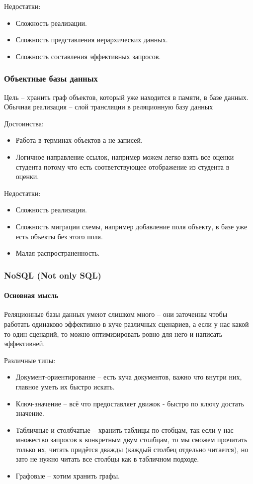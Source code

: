 Недостатки:
\begin{itemize}
	\item Сложность реализации.
	\item Сложность представления иерархических данных.
	\item Сложность составления эффективных запросов.
\end{itemize}

\subsubsection{Объектные базы данных}
Цель -- хранить граф объектов, который уже находится в памяти, в базе данных. Обычная реализация --
слой трансляции в реляционную базу данных

\enewline

Достоинства:
\begin{itemize}
	\item Работа в терминах объектов а не записей.
	\item Логичное направление ссылок, например можем легко взять все оценки студента потому что есть
	      соответствующее отображение из студента в оценки.
\end{itemize}

Недостатки:
\begin{itemize}
	\item Сложность реализации.
	\item Сложность миграции схемы, например добавление поля объекту, в базе уже есть объекты без этого поля.
	\item Малая распространенность.
\end{itemize}

\subsubsection{NoSQL (Not only SQL)}

\paragraph{Основная мысль} Реляционные базы данных умеют слишком много -- они заточенны чтобы работать
одинаково эффективно в куче различных сценариев, а если у нас какой то один сценарий, то можно
оптимизировать ровно для него и написать эффективней.

\enewline

Различные типы:
\begin{itemize}
	\item Документ-ориентированне -- есть куча документов, важно что внутри них, главное уметь их быстро
	      искать.
	\item Ключ-значение -- всё что предоставляет движок - быстро по ключу достать значение.
	\item Табличные и столбчатые -- хранить таблицы по стобцам, так если у нас множество запросов к
	      конкретным двум столбцам, то мы сможем прочитать только их, читать придётся дважды (каждый столбец
	      отдельно читается), но зато не нужно читать все столбцы как в табличном подходе.
	\item Графовые -- хотим хранить графы.
\end{itemize}

